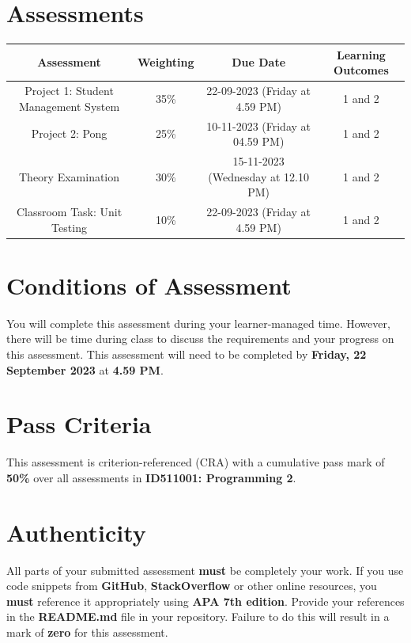 \documentclass{article}
\begin{document}
\section*{Assessments}
\renewcommand{\arraystretch}{1.5}
\begin{tabular}{|c|c|c|c|}
	\hline
	\textbf{Assessment}                                 & \textbf{Weighting} & \textbf{Due Date}            & \textbf{Learning Outcomes} \\ \hline
	\small Project 1: Student Management System  & \small 35\%        & \small 22-09-2023 (Friday at 4.59 PM)   & \small 1 and 2                   \\ \hline
	\small Project 2: Pong & \small 25\%        & \small 10-11-2023 (Friday at 04.59 PM)  & \small 1 and 2                   \\ \hline
	\small Theory Examination                        & \small 30\%        & \small 15-11-2023 (Wednesday at 12.10 PM)  & \small 1 and 2                   \\ \hline
	\small Classroom Task: Unit Testing                       & \small 10\%        & \small 22-09-2023 (Friday at 4.59 PM)  & \small 1 and 2                   \\ \hline
\end{tabular} 

\section*{Conditions of Assessment}
You will complete this assessment during your learner-managed time. However, there will be time during class to discuss the requirements and your progress on this assessment. This assessment will need to be completed by \textbf{Friday, 22 September 2023} at \textbf{4.59 PM}.

\section*{Pass Criteria}
This assessment is criterion-referenced (CRA) with a cumulative pass mark of \textbf{50\%} over all assessments in \textbf{ID511001: Programming 2}.

\section*{Authenticity}
All parts of your submitted assessment \textbf{must} be completely your work. If you use code snippets from \textbf{GitHub}, \textbf{StackOverflow} or other online resources, you \textbf{must} reference it appropriately using \textbf{APA 7th edition}. Provide your references in the \textbf{README.md} file in your repository. Failure to do this will result in a mark of \textbf{zero} for this assessment. 
\end{document}
